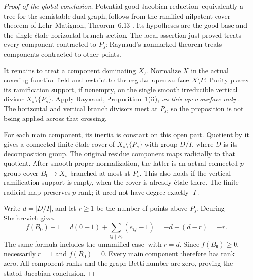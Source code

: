 \begin{proof}[Proof of the global conclusion]
Potential good Jacobian reduction, equivalently a tree
for the semistable dual graph, follows from the ramified
nilpotent-cover theorem of Lehr--Matignon,
Theorem~6.13 \cite{fghLehrMatignon2005}. Its hypotheses
are the good base and the single \'etale horizontal branch
section. The local assertion just proved treats every
component contracted to \(P_s\); Raynaud's nonmarked
theorem treats components contracted to other points.

It remains to treat a component dominating \(X_s\).
Normalize \(X\) in the actual covering function field
and restrict to the regular open surface \(X\setminus P\).
Purity places its ramification support, if nonempty, on
the single smooth irreducible vertical divisor
\(X_s\setminus\{P_s\}\). Apply Raynaud,
Proposition~1(ii), \emph{on this open surface only}
\cite{fghRaynaud1990Pgroups}. The horizontal and vertical branch
divisors meet at \(P_s\), so the proposition is not
being applied across that crossing.

For each main component, its inertia is constant on this
open part. Quotient by it gives a connected finite \'etale
cover of \(X_s\setminus\{P_s\}\) with group \(D/I\),
where \(D\) is its decomposition group. The original
residue component maps radicially to that quotient.
After smooth proper normalization, the latter is an actual
connected \(p\)-group cover \(B_0\to X_s\) branched
at most at \(P_s\). This also holds if the vertical
ramification support is empty, when the cover is already
\'{e}tale there. The finite radicial map preserves
\(p\)-rank; it need not have degree exactly \(|I|\).

Write \(d=|D/I|\), and let \(r\ge1\) be the number
of points above \(P_s\). Deuring--Shafarevich \cite[Corollary 1.8]{fghCrew1984} gives
\[
 f(B_0)-1=d(0-1)+\sum_{Q\mid P_s}(e_Q-1)
              =-d+(d-r)=-r.                            \tag{SB.4}
\]
The same formula includes the unramified case, with
\(r=d\). Since \(f(B_0)\ge0\), necessarily \(r=1\)
and \(f(B_0)=0\). Every main component therefore has
rank zero. All component ranks and the graph Betti number
are zero, proving the stated Jacobian conclusion.
\end{proof}

